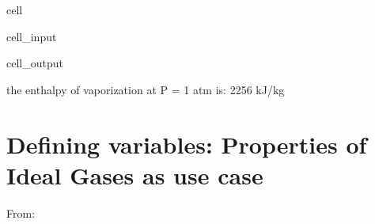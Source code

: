 \documentclass[letterpaper,10pt,english]{jupyterBook}
\begin{document}
\begin{sphinxuseclass}{cell}\begin{sphinxVerbatimInput}

\begin{sphinxuseclass}{cell_input}
\begin{sphinxVerbatim}[commandchars=\\\{\}]
   
\end{sphinxVerbatim}

\end{sphinxuseclass}\end{sphinxVerbatimInput}
\begin{sphinxVerbatimOutput}

\begin{sphinxuseclass}{cell_output}
\begin{sphinxVerbatim}[commandchars=\\\{\}]
the enthalpy of vaporization at P = 1 atm is: 2256 kJ/kg
\end{sphinxVerbatim}

\end{sphinxuseclass}\end{sphinxVerbatimOutput}

\end{sphinxuseclass}

\section{}
\label{\detokenize{notebooks/getting_started/basic_math:id1}}
\sphinxstepscope


\chapter{Defining variables: Properties of Ideal Gases as use case}
\label{\detokenize{notebooks/getting_started/Table_G1_Properties_of_ideal_gases:defining-variables-properties-of-ideal-gases-as-use-case}}\label{\detokenize{notebooks/getting_started/Table_G1_Properties_of_ideal_gases::doc}}
\sphinxAtStartPar
From: 
\end{document}
